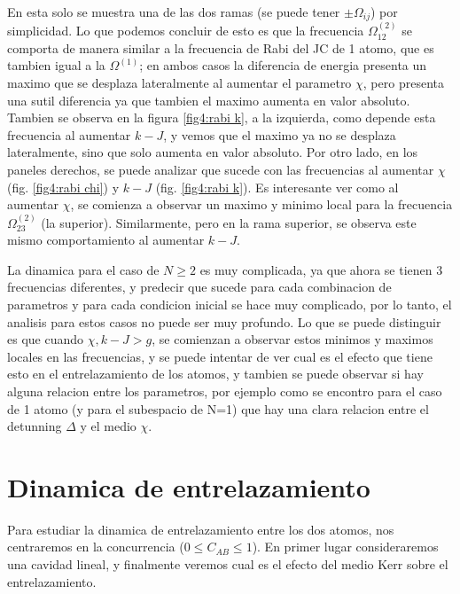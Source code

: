 En esta solo se muestra una de las dos ramas (se puede tener $\pm \Omega_{ij}$) por simplicidad. Lo que podemos concluir de esto es que la frecuencia $\Omega^(2)_{12}$ se comporta de manera similar a la frecuencia de Rabi del JC de 1 atomo, que es tambien igual a la $\Omega^(1)$; en ambos casos la diferencia de energia presenta un maximo que se desplaza lateralmente al aumentar el parametro $\chi$, pero presenta una sutil diferencia ya que tambien el maximo aumenta en valor absoluto. Tambien se observa en la figura \ref{fig4:rabi k}, a la izquierda, como depende esta frecuencia al aumentar $k-J$, y vemos que el maximo ya no se desplaza lateralmente, sino que solo aumenta en valor absoluto. Por otro lado, en los paneles derechos, se puede analizar que sucede con las frecuencias al aumentar $\chi$ (fig. \ref{fig4:rabi chi}) y $k-J$ (fig. \ref{fig4:rabi k}). Es interesante ver como al aumentar $\chi$, se comienza a observar un maximo y minimo local para la frecuencia $\Omega^{(2)}_{23}$ (la superior). Similarmente, pero en la rama superior, se observa este mismo comportamiento al aumentar $k-J$.

La dinamica para el caso de $N\geq2$ es muy complicada, ya que ahora se tienen 3 frecuencias diferentes, y predecir que sucede para cada combinacion de parametros y para cada condicion inicial se hace muy complicado, por lo tanto, el analisis para estos casos no puede ser muy profundo. Lo que se puede distinguir es que cuando $\chi,k-J>g$, se comienzan a observar estos minimos y maximos locales en las frecuencias, y se puede intentar de ver cual es el efecto que tiene esto en el entrelazamiento de los atomos, y tambien se puede observar si hay alguna relacion entre los parametros, por ejemplo como se encontro para el caso de 1 atomo (y para el subespacio de N=1) que hay una clara relacion entre el detunning $\Delta$ y el medio $\chi$.
\section{Dinamica de entrelazamiento}
Para estudiar la dinamica de entrelazamiento entre los dos atomos, nos centraremos en la concurrencia ($0\leq C_{AB} \leq 1$).
En primer lugar consideraremos una cavidad lineal, y finalmente veremos cual es el efecto del medio Kerr sobre el entrelazamiento.

